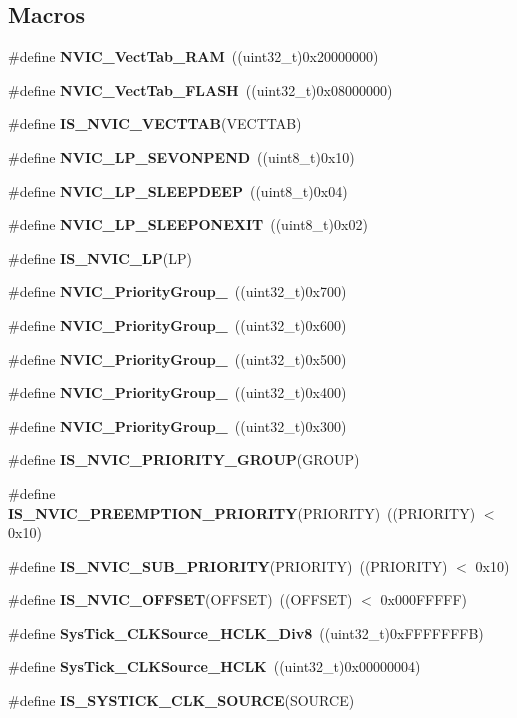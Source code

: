 \subsection*{Macros}
\begin{DoxyCompactItemize}
\item 
\#define \textbf{ N\+V\+I\+C\+\_\+\+Vect\+Tab\+\_\+\+R\+AM}~((uint32\+\_\+t)0x20000000)
\item 
\#define \textbf{ N\+V\+I\+C\+\_\+\+Vect\+Tab\+\_\+\+F\+L\+A\+SH}~((uint32\+\_\+t)0x08000000)
\item 
\#define \textbf{ I\+S\+\_\+\+N\+V\+I\+C\+\_\+\+V\+E\+C\+T\+T\+AB}(V\+E\+C\+T\+T\+AB)
\item 
\#define \textbf{ N\+V\+I\+C\+\_\+\+L\+P\+\_\+\+S\+E\+V\+O\+N\+P\+E\+ND}~((uint8\+\_\+t)0x10)
\item 
\#define \textbf{ N\+V\+I\+C\+\_\+\+L\+P\+\_\+\+S\+L\+E\+E\+P\+D\+E\+EP}~((uint8\+\_\+t)0x04)
\item 
\#define \textbf{ N\+V\+I\+C\+\_\+\+L\+P\+\_\+\+S\+L\+E\+E\+P\+O\+N\+E\+X\+IT}~((uint8\+\_\+t)0x02)
\item 
\#define \textbf{ I\+S\+\_\+\+N\+V\+I\+C\+\_\+\+LP}(LP)
\item 
\#define \textbf{ N\+V\+I\+C\+\_\+\+Priority\+Group\+\_}~((uint32\+\_\+t)0x700)
\item 
\#define \textbf{ N\+V\+I\+C\+\_\+\+Priority\+Group\+\_}~((uint32\+\_\+t)0x600)
\item 
\#define \textbf{ N\+V\+I\+C\+\_\+\+Priority\+Group\+\_}~((uint32\+\_\+t)0x500)
\item 
\#define \textbf{ N\+V\+I\+C\+\_\+\+Priority\+Group\+\_}~((uint32\+\_\+t)0x400)
\item 
\#define \textbf{ N\+V\+I\+C\+\_\+\+Priority\+Group\+\_}~((uint32\+\_\+t)0x300)
\item 
\#define \textbf{ I\+S\+\_\+\+N\+V\+I\+C\+\_\+\+P\+R\+I\+O\+R\+I\+T\+Y\+\_\+\+G\+R\+O\+UP}(G\+R\+O\+UP)
\item 
\#define \textbf{ I\+S\+\_\+\+N\+V\+I\+C\+\_\+\+P\+R\+E\+E\+M\+P\+T\+I\+O\+N\+\_\+\+P\+R\+I\+O\+R\+I\+TY}(P\+R\+I\+O\+R\+I\+TY)~((P\+R\+I\+O\+R\+I\+TY) $<$ 0x10)
\item 
\#define \textbf{ I\+S\+\_\+\+N\+V\+I\+C\+\_\+\+S\+U\+B\+\_\+\+P\+R\+I\+O\+R\+I\+TY}(P\+R\+I\+O\+R\+I\+TY)~((P\+R\+I\+O\+R\+I\+TY) $<$ 0x10)
\item 
\#define \textbf{ I\+S\+\_\+\+N\+V\+I\+C\+\_\+\+O\+F\+F\+S\+ET}(O\+F\+F\+S\+ET)~((O\+F\+F\+S\+ET) $<$ 0x000\+F\+F\+F\+F\+F)
\item 
\#define \textbf{ Sys\+Tick\+\_\+\+C\+L\+K\+Source\+\_\+\+H\+C\+L\+K\+\_\+\+Div8}~((uint32\+\_\+t)0x\+F\+F\+F\+F\+F\+F\+F\+B)
\item 
\#define \textbf{ Sys\+Tick\+\_\+\+C\+L\+K\+Source\+\_\+\+H\+C\+LK}~((uint32\+\_\+t)0x00000004)
\item 
\#define \textbf{ I\+S\+\_\+\+S\+Y\+S\+T\+I\+C\+K\+\_\+\+C\+L\+K\+\_\+\+S\+O\+U\+R\+CE}(S\+O\+U\+R\+CE)
\end{DoxyCompactItemize}
